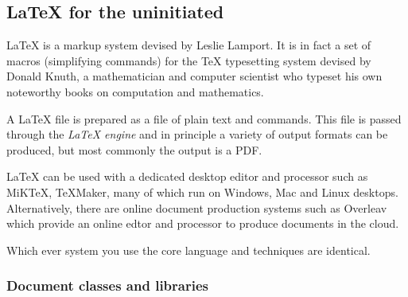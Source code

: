 \documentclass[]{article}
\begin{document}
\subsection{\LaTeX{} for the uninitiated}

\LaTeX{} is a markup system devised by Leslie Lamport.  It is in fact a set of macros (simplifying commands) for the \TeX{} typesetting system devised by Donald Knuth, a mathematician and computer scientist who typeset his own noteworthy books on computation and mathematics.

A \LaTeX{} file is prepared as a file of plain text and commands.  This file is passed through the \emph{\LaTeX{} engine} and in principle a variety of output formats can be produced, but most commonly the output is a PDF.

\LaTeX{} can be used with a dedicated desktop editor and processor such as MiKTeX, TeXMaker, many of which run on Windows, Mac and Linux desktops.  Alternatively, there are online document production systems such as Overleav which provide an online edtor and processor to produce documents in the cloud.

Which ever system you use the core language and techniques are identical.

\subsubsection{Document classes and libraries}
\end{document}
